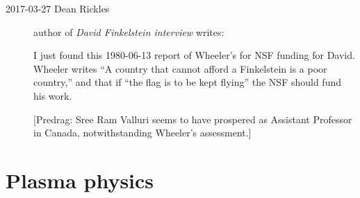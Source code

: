 \begin{description}
\item[2017-03-27 Dean Rickles]
author of {\em {David Finkelstein} interview} writes:

I just found
{this 1980-06-13 report} of Wheeler's for NSF funding for David. Wheeler
writes ``A country that cannot afford a Finkelstein is a poor country,''
and that if ``the flag is to be kept flying'' the NSF should fund his
work.

[Predrag: 
{Sree Ram Valluri} seems to have prospered as Assistant Professor in
Canada, notwithstanding Wheeler's assessment.]




\end{description}

\section{Plasma physics}
\label{sect:plasma}

